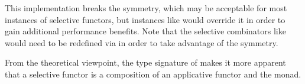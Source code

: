 \noindent
This implementation breaks the symmetry, which may be acceptable for most
instances of selective functors, but instances like  would override it
in order to gain additional performance benefits. Note that the selective
combinators like \hs{<||>} would need to be redefined via  in order
to take advantage of the symmetry.

From the theoretical viewpoint, the type signature of  makes it
more apparent that a selective functor  is a composition of an applicative
functor  and the  monad.


